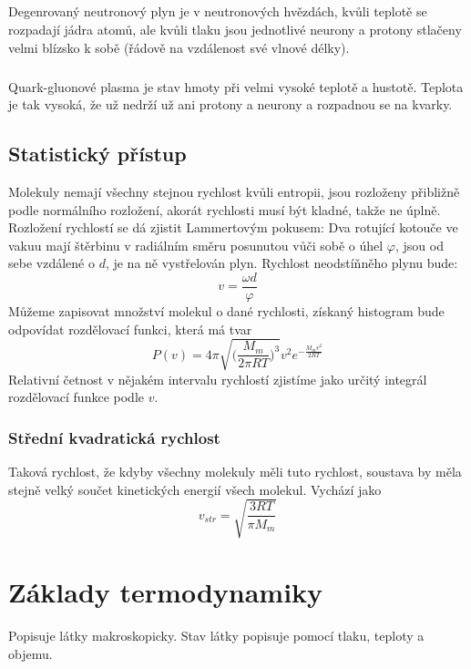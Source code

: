 \documentclass[titlepage]{book}
\begin{document}
\paragraph{}
Degenrovaný neutronový plyn je v neutronových hvězdách, kvůli teplotě se rozpadají jádra atomů, ale kvůli tlaku jsou jednotlivé neurony a protony stlačeny velmi blízsko k sobě (řádově na vzdálenost své vlnové délky).
\paragraph{}
Quark-gluonové plasma je stav hmoty při velmi vysoké teplotě a hustotě. Teplota je tak vysoká, že už nedrží už ani protony a neurony a rozpadnou se na kvarky.
\section{Statistický přístup}
Molekuly nemají všechny stejnou rychlost kvůli entropii, jsou rozloženy přibližně podle normálního rozložení, akorát rychlosti musí být kladné, takže ne úplně. Rozložení rychlostí se dá zjistit Lammertovým pokusem: Dva rotující kotouče ve vakuu mají štěrbinu v radiálním směru posunutou vůči sobě o úhel $\varphi$, jsou od sebe vzdálené o $d$, je na ně vystřelován plyn. Rychlost neodstíňněho plynu bude:\\
\begin{equation}
v = \frac{\omega d}{\varphi}
\end{equation}
Můžeme zapisovat množství molekul o dané rychlosti, získaný histogram bude odpovídat rozdělovací funkci, která má tvar\\
\begin{equation}
P(v)=4\pi \sqrt{\Big ( \frac{M_m}{2\pi RT}\Big )^3} v^2e^{-\frac{M_mv^2}{2RT}}
\end{equation}
Relativní četnost v nějakém intervalu rychlostí zjistíme jako určitý integrál rozdělovací funkce podle $v$.
\subsection{Střední kvadratická rychlost}
Taková rychlost, že kdyby všechny molekuly měli tuto rychlost, soustava by měla stejně velký součet kinetických energií všech molekul. Vychází jako\\
\begin{equation}
v_{str} = \sqrt{\frac{3RT}{\pi M_m}}
\end{equation}
\chapter{Základy termodynamiky}
Popisuje látky makroskopicky. Stav látky popisuje pomocí tlaku, teploty a objemu.
\end{document}
